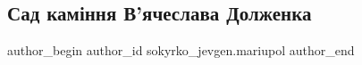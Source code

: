  
 
 
 
 

\subsection{Сад каміння В'ячеслава Долженка}
\label{sec:09_02_2023.fb.sokyrko_jevgen.mariupol.1.sad_kam_nnya_v_yache}

\ifcmt
 author_begin
   author_id sokyrko_jevgen.mariupol
 author_end
\fi
